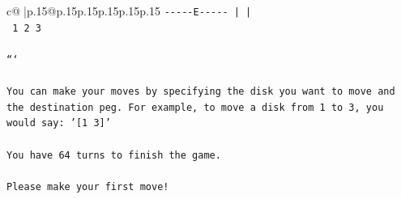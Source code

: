 \documentclass{article}
\begin{document}
{\begin{supertabular}{c@{$\;$}|p{.15\linewidth}@{}p{.15\linewidth}p{.15\linewidth}p{.15\linewidth}p{.15\linewidth}p{.15\linewidth}}
{{{\texttt{{-}{-}{-}{-}{-}E{-}{-}{-}{-}{-}      |           |     } \\
\texttt{     1           2           3     } \\
\\ 
\texttt{```} \\
\\ 
\texttt{You can make your moves by specifying the disk you want to move and the destination peg. For example, to move a disk from 1 to 3, you would say: '{[}1 3{]}'} \\
\\ 
\texttt{You have 64 turns to finish the game.} \\
\\ 
\texttt{Please make your first move!} \\
            }
        }
    }
     \\ \\


\end{supertabular}}
\end{document}
